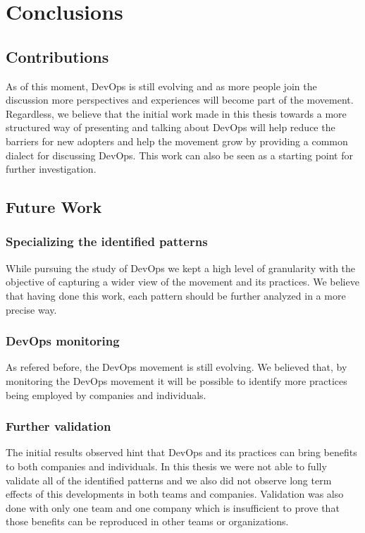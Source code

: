 \chapter{ Conclusions } \label{chap:conclusion}
    \section{Contributions}
    As of this moment, DevOps is still evolving and as more people join the discussion more perspectives and experiences will become part of the movement. Regardless, we believe that the initial work made in this thesis towards a more structured way of presenting and talking about DevOps will help reduce the barriers for new adopters and help the movement grow by providing a common dialect for discussing DevOps. This work can also be seen as a starting point for further investigation.



    \section{Future Work}
      \subsection{Specializing the identified patterns}
      While pursuing the study of DevOps we kept a high level of granularity with the objective of capturing a wider view of the movement and its practices. We believe that having done this work, each pattern should be further analyzed in a more precise way.
      \subsection{DevOps monitoring}
      As refered before, the DevOps movement is still evolving. We believed that, by monitoring the DevOps movement it will be possible to identify more practices being employed by companies and individuals.
      \subsection{Further validation}
      The initial results observed hint that DevOps and its practices can bring benefits to both companies and individuals. In this thesis we were not able to fully validate all of the identified patterns and we also did not observe long term effects of this developments in both teams and companies. Validation was also done with only one team and one company which is insufficient to prove that those benefits can be reproduced in other teams or organizations. 
